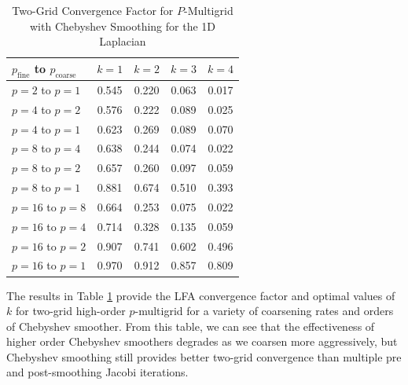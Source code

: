 \begin{table}[ht!]
\begin{center}
\begin{tabular}{l c c c c}
  \toprule
  $p_{\text{fine}}$ to $p_{\text{coarse}}$  &  $k = 1$   &  $k = 2$   &  $k = 3$   &  $k = 4$   \\
  \toprule
  $p = 2$ to $p = 1$   &  0.545  &  0.220  &  0.063  &  0.017  \\
  \midrule
  $p = 4$ to $p = 2$   &  0.576  &  0.222  &  0.089  &  0.025  \\
  $p = 4$ to $p = 1$   &  0.623  &  0.269  &  0.089  &  0.070  \\
  \midrule
  $p = 8$ to $p = 4$   &  0.638  &  0.244  &  0.074  &  0.022  \\
  $p = 8$ to $p = 2$   &  0.657  &  0.260  &  0.097  &  0.059  \\
  $p = 8$ to $p = 1$   &  0.881  &  0.674  &  0.510  &  0.393  \\
  \midrule
  $p = 16$ to $p = 8$  &  0.664  &  0.253  &  0.075  &  0.022  \\
  $p = 16$ to $p = 4$  &  0.714  &  0.328  &  0.135  &  0.059  \\
  $p = 16$ to $p = 2$  &  0.907  &  0.741  &  0.602  &  0.496  \\
  $p = 16$ to $p = 1$  &  0.970  &  0.912  &  0.857  &  0.809  \\
  \bottomrule
\end{tabular}
\end{center}
\caption{Two-Grid Convergence Factor for $P$-Multigrid with Chebyshev Smoothing for the 1D Laplacian}
\label{table:two_grid_1d_chebyshev}
\end{table}

The results in Table \ref{table:two_grid_1d_chebyshev} provide the LFA convergence factor and optimal values of $k$ for two-grid high-order $p$-multigrid for a variety of coarsening rates and orders of Chebyshev smoother.
From this table, we can see that the effectiveness of higher order Chebyshev smoothers degrades as we coarsen more aggressively, but Chebyshev smoothing still provides better two-grid convergence than multiple pre and post-smoothing Jacobi iterations.

